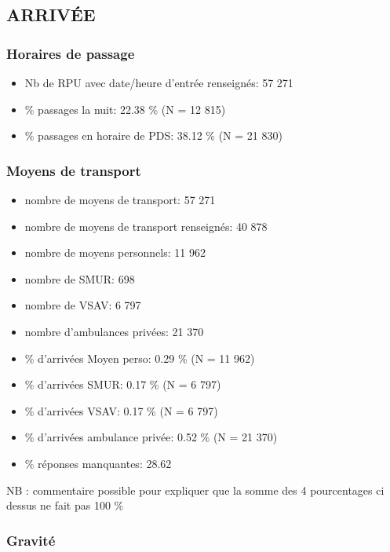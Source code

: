 \documentclass[]{article}
\begin{document}
\subsection{ARRIVÉE}\label{arrivee-1}

\subsubsection{Horaires de passage}\label{horaires-de-passage-1}

\begin{itemize}
\itemsep1pt\parskip0pt
\item
  Nb de RPU avec date/heure d'entrée renseignés: 57 271
\item
  \% passages la nuit: 22.38 \% (N = 12 815)
\item
  \% passages en horaire de PDS: 38.12 \% (N = 21 830)
\end{itemize}

\subsubsection{Moyens de transport}\label{moyens-de-transport}

\begin{itemize}
\item
  nombre de moyens de transport: 57 271
\item
  nombre de moyens de transport renseignés: 40 878
\item
  nombre de moyens personnels: 11 962
\item
  nombre de SMUR: 698
\item
  nombre de VSAV: 6 797
\item
  nombre d'ambulances privées: 21 370
\item
  \% d'arrivées Moyen perso: 0.29 \% (N = 11 962)
\item
  \% d'arrivées SMUR: 0.17 \% (N = 6 797)
\item
  \% d'arrivées VSAV: 0.17 \% (N = 6 797)
\item
  \% d'arrivées ambulance privée: 0.52 \% (N = 21 370)
\item
  \% réponses manquantes: 28.62
\end{itemize}

NB : commentaire possible pour expliquer que la somme des 4 pourcentages
ci dessus ne fait pas 100 \%

\subsubsection{Gravité}\label{gravite}
\end{document}
